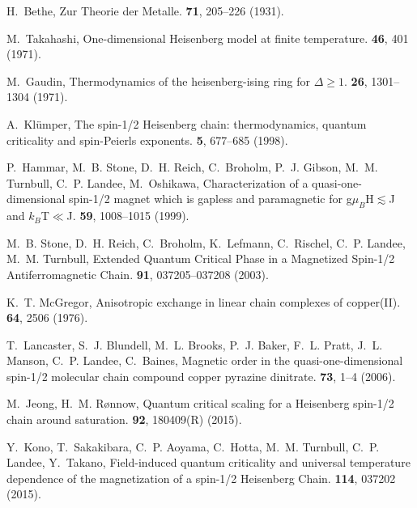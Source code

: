 \documentclass[12pt]{article}
\begin{document}
\begin{thebibliography}{10}
H.~Bethe, {Zur Theorie der Metalle}.
 {\bf 71}, 205--226 (1931).

M.~Takahashi, {One-dimensional Heisenberg model at finite temperature}.
 {\bf 46}, 401 (1971).

M.~Gaudin, {Thermodynamics of the heisenberg-ising ring for $\Delta \geq 1$}.
 {\bf 26}, 1301--1304 (1971).

A.~Kl{\"{u}}mper, {The spin-1/2 Heisenberg chain: thermodynamics, quantum
  criticality and spin-Peierls exponents}.
 {\bf 5}, 677--685 (1998).

P.~Hammar, M.~B. Stone, D.~H. Reich, C.~Broholm, P.~J. Gibson, M.~M. Turnbull,
  C.~P. Landee, M.~Oshikawa, {Characterization of a quasi-one-dimensional
  spin-1/2 magnet which is gapless and paramagnetic for g$\mu_B$H$\lesssim$J
  and $k_B$T$\ll$J}.
 {\bf 59}, 1008--1015 (1999).

M.~B. Stone, D.~H. Reich, C.~Broholm, K.~Lefmann, C.~Rischel, C.~P. Landee,
  M.~M. Turnbull, {Extended Quantum Critical Phase in a Magnetized Spin-1/2
  Antiferromagnetic Chain}.
 {\bf 91}, 037205--037208 (2003).

K.~T. McGregor, {Anisotropic exchange in linear chain complexes of copper(II)}.
 {\bf 64}, 2506 (1976).

T.~Lancaster, S.~J. Blundell, M.~L. Brooks, P.~J. Baker, F.~L. Pratt, J.~L.
  Manson, C.~P. Landee, C.~Baines, {Magnetic order in the quasi-one-dimensional
  spin-1/2 molecular chain compound copper pyrazine dinitrate}.
  {\bf 73}, 1--4 (2006).

M.~Jeong, H.~M. R{\o}nnow, {Quantum critical scaling for a Heisenberg spin-1/2
  chain around saturation}.
  {\bf 92}, 180409(R) (2015).

Y.~Kono, T.~Sakakibara, C.~P. Aoyama, C.~Hotta, M.~M. Turnbull, C.~P. Landee,
  Y.~Takano, {Field-induced quantum criticality and universal temperature
  dependence of the magnetization of a spin-1/2 Heisenberg Chain}.
 {\bf 114}, 037202 (2015).


\end{thebibliography}
\end{document}
